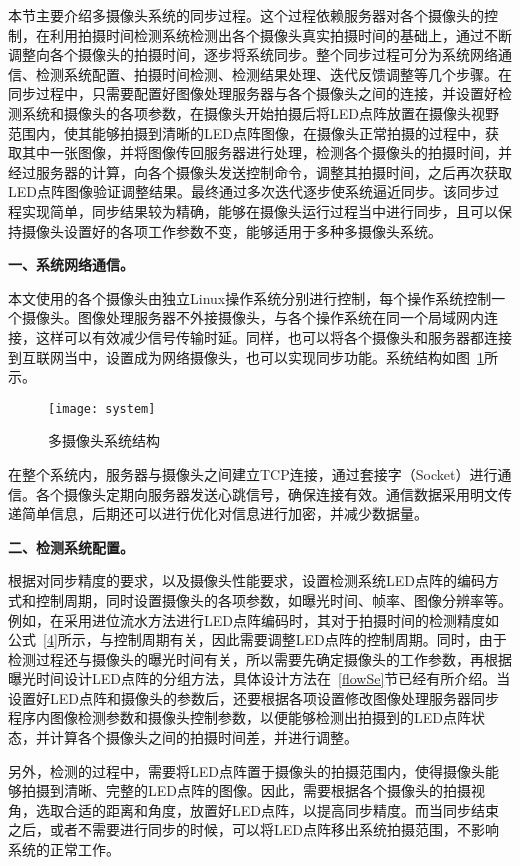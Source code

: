 本节主要介绍多摄像头系统的同步过程。这个过程依赖服务器对各个摄像头的控制，在利用拍摄时间检测系统检测出各个摄像头真实拍摄时间的基础上，通过不断调整向各个摄像头的拍摄时间，逐步将系统同步。整个同步过程可分为系统网络通信、检测系统配置、拍摄时间检测、检测结果处理、迭代反馈调整等几个步骤。在同步过程中，只需要配置好图像处理服务器与各个摄像头之间的连接，并设置好检测系统和摄像头的各项参数，在摄像头开始拍摄后将LED点阵放置在摄像头视野范围内，使其能够拍摄到清晰的LED点阵图像，在摄像头正常拍摄的过程中，获取其中一张图像，并将图像传回服务器进行处理，检测各个摄像头的拍摄时间，并经过服务器的计算，向各个摄像头发送控制命令，调整其拍摄时间，之后再次获取LED点阵图像验证调整结果。最终通过多次迭代逐步使系统逼近同步。该同步过程实现简单，同步结果较为精确，能够在摄像头运行过程当中进行同步，且可以保持摄像头设置好的各项工作参数不变，能够适用于多种多摄像头系统。

\textbf{一、系统网络通信。}

本文使用的各个摄像头由独立Linux操作系统分别进行控制，每个操作系统控制一个摄像头。图像处理服务器不外接摄像头，与各个操作系统在同一个局域网内连接，这样可以有效减少信号传输时延。同样，也可以将各个摄像头和服务器都连接到互联网当中，设置成为网络摄像头，也可以实现同步功能。系统结构如图~\ref{system}所示。

\begin{figure}[h] 
  \centering
  \texttt{[image: system]}
  \caption{多摄像头系统结构}
    \label{system}
\end{figure}

在整个系统内，服务器与摄像头之间建立TCP连接，通过套接字（Socket）进行通信。各个摄像头定期向服务器发送心跳信号，确保连接有效。通信数据采用明文传递简单信息，后期还可以进行优化对信息进行加密，并减少数据量。

\textbf{二、检测系统配置。}

根据对同步精度的要求，以及摄像头性能要求，设置检测系统LED点阵的编码方式和控制周期，同时设置摄像头的各项参数，如曝光时间、帧率、图像分辨率等。例如，在采用进位流水方法进行LED点阵编码时，其对于拍摄时间的检测精度如公式~\ref{4}所示，与控制周期有关，因此需要调整LED点阵的控制周期。同时，由于检测过程还与摄像头的曝光时间有关，所以需要先确定摄像头的工作参数，再根据曝光时间设计LED点阵的分组方法，具体设计方法在~\ref{flowSe}节已经有所介绍。当设置好LED点阵和摄像头的参数后，还要根据各项设置修改图像处理服务器同步程序内图像检测参数和摄像头控制参数，以便能够检测出拍摄到的LED点阵状态，并计算各个摄像头之间的拍摄时间差，并进行调整。

另外，检测的过程中，需要将LED点阵置于摄像头的拍摄范围内，使得摄像头能够拍摄到清晰、完整的LED点阵的图像。因此，需要根据各个摄像头的拍摄视角，选取合适的距离和角度，放置好LED点阵，以提高同步精度。而当同步结束之后，或者不需要进行同步的时候，可以将LED点阵移出系统拍摄范围，不影响系统的正常工作。

